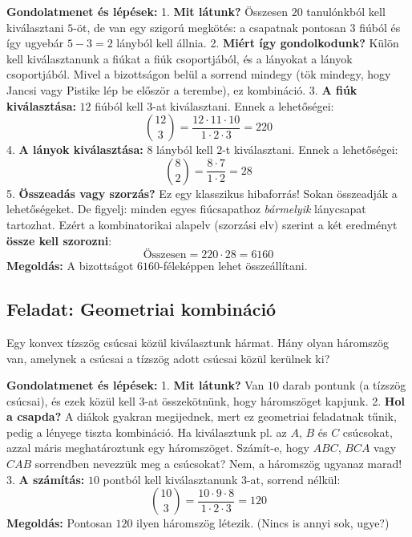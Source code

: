 \documentclass[a4paper,12pt]{article}
\theoremstyle{definition} %
\begin{document}
\textbf{Gondolatmenet és lépések:}
1. \textbf{Mit látunk?} Összesen $20$ tanulónkból kell kiválasztani $5$-öt, de van egy szigorú megkötés: a csapatnak pontosan $3$ fiúból és így ugyebár $5 - 3 = 2$ lányból kell állnia.
2. \textbf{Miért így gondolkodunk?} Külön kell kiválasztanunk a fiúkat a fiúk csoportjából, és a lányokat a lányok csoportjából. Mivel a bizottságon belül a sorrend mindegy (tök mindegy, hogy Jancsi vagy Pistike lép be először a terembe), ez kombináció.
3. \textbf{A fiúk kiválasztása:} $12$ fiúból kell $3$-at kiválasztani. Ennek a lehetőségei:
$$\binom{12}{3} = \frac{12 \cdot 11 \cdot 10}{1 \cdot 2 \cdot 3} = 220$$
4. \textbf{A lányok kiválasztása:} $8$ lányból kell $2$-t kiválasztani. Ennek a lehetőségei:
$$\binom{8}{2} = \frac{8 \cdot 7}{1 \cdot 2} = 28$$
5. \textbf{Összeadás vagy szorzás?} Ez egy klasszikus hibaforrás! Sokan összeadják a lehetőségeket. De figyelj: minden egyes fiúcsapathoz \textit{bármelyik} lánycsapat tartozhat. Ezért a kombinatorikai alapelv (szorzási elv) szerint a két eredményt \textbf{össze kell szorozni}:
$$\text{Összesen} = 220 \cdot 28 = 6160$$
\textbf{Megoldás:} A bizottságot $6160$-féleképpen lehet összeállítani.

\subsection*{Feladat: Geometriai kombináció}
\begin{tcolorbox}
Egy konvex tízszög csúcsai közül kiválasztunk hármat. Hány olyan háromszög van, amelynek a csúcsai a tízszög adott csúcsai közül kerülnek ki?
\end{tcolorbox}

\textbf{Gondolatmenet és lépések:}
1. \textbf{Mit látunk?} Van $10$ darab pontunk (a tízszög csúcsai), és ezek közül kell $3$-at összekötnünk, hogy háromszöget kapjunk.
2. \textbf{Hol a csapda?} A diákok gyakran megijednek, mert ez geometriai feladatnak tűnik, pedig a lényege tiszta kombináció. Ha kiválasztunk pl. az $A$, $B$ és $C$ csúcsokat, azzal máris meghatároztunk egy háromszöget. Számít-e, hogy $ABC$, $BCA$ vagy $CAB$ sorrendben nevezzük meg a csúcsokat? Nem, a háromszög ugyanaz marad!
3. \textbf{A számítás:} $10$ pontból kell kiválasztanunk $3$-at, sorrend nélkül:
$$\binom{10}{3} = \frac{10 \cdot 9 \cdot 8}{1 \cdot 2 \cdot 3} = 120$$
\textbf{Megoldás:} Pontosan $120$ ilyen háromszög létezik. (Nincs is annyi sok, ugye?)
\end{document}
